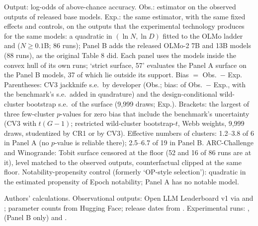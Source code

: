 \begin{table}[tp]
\begin{tablenotes}
Output: log-odds of above-chance accuracy. Obs.: estimator on the observed outputs of released base models. Exp.: the same estimator, with the same fixed effects and controls, on the outputs that the experimental technology produces for the same models: a quadratic in $(\ln N,\ln D)$ fitted to the OLMo ladder and \citet{gadre2024language} ($N\geq0.1$B; 86 runs); Panel B adds the released OLMo-2 7B and 13B models (88 runs), as the original Table 8 did. Each panel uses the models inside the convex hull of its own runs; `strict surface, 57' evaluates the Panel A surface on the Panel B models, 37 of which lie outside its support. Bias $=$ Obs.\ $-$ Exp. Parentheses: CV3 jackknife s.e.\ by developer (Obs.; bias: of Obs.\ $-$ Exp., with the benchmark's s.e.\ added in quadrature) and the design-conditional wild-cluster bootstrap s.e.\ of the surface (9,999 draws; Exp.). Brackets: the largest of three few-cluster $p$-values for zero bias that include the benchmark's uncertainty (CV3 with $t(G-1)$; restricted wild-cluster bootstrap-$t$, Webb weights, 9,999 draws, studentized by CR1 or by CV3). Effective numbers of clusters: 1.2--3.8 of 6 in Panel A (no $p$-value is reliable there); 2.5--6.7 of 19 in Panel B. ARC-Challenge and Winogrande: Tobit surface censored at the floor (52 and 16 of 86 runs are at it), level matched to the observed outputs, counterfactual clipped at the same floor. Notability-propensity control (formerly `OP-style selection'): quadratic in the estimated propensity of Epoch notability; Panel A has no notable model.
\end{tablenotes}
\begin{tablenotes}[Source]
Authors' calculations. Observational outputs: Open LLM Leaderboard v1 via \citet{ruan2024observational} and \citet{maiapolo2024sloth}; parameter counts from Hugging Face; release dates from \citet{epochai2026data}. Experimental runs: \citet{bhagia2024establishing}, \citet{teamolmo2024olmo} (Panel B only) and \citet{gadre2024language}.
\end{tablenotes}
\end{table}
